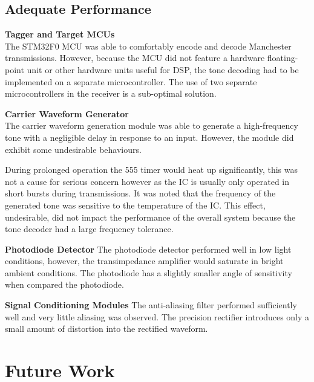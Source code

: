 \subsection{Adequate Performance}

\textbf{Tagger and Target MCUs}\\
The STM32F0 MCU was able to comfortably encode and decode Manchester transmissions. However, because the MCU did not feature a hardware floating-point unit or other hardware units useful for DSP, the tone decoding had to be implemented on a separate microcontroller. The use of two separate microcontrollers in the receiver is a sub-optimal solution.


\textbf{Carrier Waveform Generator}\\
The carrier waveform generation module was able to generate a high-frequency tone with a negligible delay in response to an input. However, the module did exhibit some undesirable behaviours.

During prolonged operation the 555 timer would heat up significantly, this was not a cause for serious concern however as the IC is usually only operated in short bursts during transmissions. It was noted that the frequency of the generated tone was sensitive to the temperature of the IC. This effect, undesirable, did not impact the performance of the overall system because the tone decoder had a large frequency tolerance. 

\textbf{Photodiode Detector}
The photodiode detector performed well in low light conditions, however, the transimpedance amplifier would saturate in bright ambient conditions. The photodiode has a slightly smaller angle of sensitivity when compared the photodiode.

\textbf{Signal Conditioning Modules}
The anti-aliasing filter performed sufficiently well and very little aliasing was observed. The precision rectifier introduces only a small amount of distortion into the rectified waveform.


\section{Future Work}

